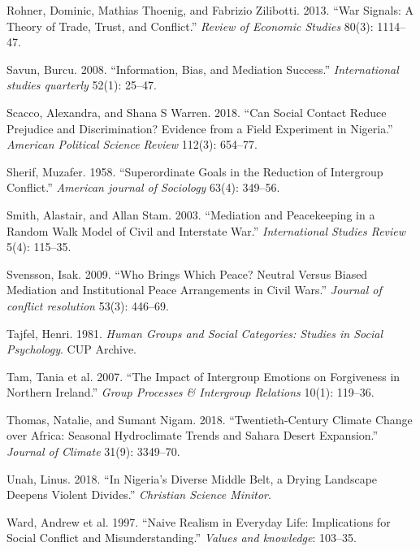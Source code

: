 \documentclass[11pt]{article}
\begin{document}
\leavevmode\hypertarget{ref-rohner2013war}{}%
Rohner, Dominic, Mathias Thoenig, and Fabrizio Zilibotti. 2013. ``War
Signals: A Theory of Trade, Trust, and Conflict.'' \emph{Review of
Economic Studies} 80(3): 1114--47.

\leavevmode\hypertarget{ref-savun2008information}{}%
Savun, Burcu. 2008. ``Information, Bias, and Mediation Success.''
\emph{International studies quarterly} 52(1): 25--47.

\leavevmode\hypertarget{ref-scacco2018nigeria}{}%
Scacco, Alexandra, and Shana S Warren. 2018. ``Can Social Contact Reduce
Prejudice and Discrimination? Evidence from a Field Experiment in
Nigeria.'' \emph{American Political Science Review} 112(3): 654--77.

\leavevmode\hypertarget{ref-sherif1958superordinate}{}%
Sherif, Muzafer. 1958. ``Superordinate Goals in the Reduction of
Intergroup Conflict.'' \emph{American journal of Sociology} 63(4):
349--56.

\leavevmode\hypertarget{ref-smith2003mediation}{}%
Smith, Alastair, and Allan Stam. 2003. ``Mediation and Peacekeeping in a
Random Walk Model of Civil and Interstate War.'' \emph{International
Studies Review} 5(4): 115--35.

\leavevmode\hypertarget{ref-svensson2009brings}{}%
Svensson, Isak. 2009. ``Who Brings Which Peace? Neutral Versus Biased
Mediation and Institutional Peace Arrangements in Civil Wars.''
\emph{Journal of conflict resolution} 53(3): 446--69.

\leavevmode\hypertarget{ref-tajfel1981groups}{}%
Tajfel, Henri. 1981. \emph{Human Groups and Social Categories: Studies
in Social Psychology}. CUP Archive.

\leavevmode\hypertarget{ref-tam2007impact}{}%
Tam, Tania et al. 2007. ``The Impact of Intergroup Emotions on
Forgiveness in Northern Ireland.'' \emph{Group Processes \& Intergroup
Relations} 10(1): 119--36.

\leavevmode\hypertarget{ref-thomas2018sahara}{}%
Thomas, Natalie, and Sumant Nigam. 2018. ``Twentieth-Century Climate
Change over Africa: Seasonal Hydroclimate Trends and Sahara Desert
Expansion.'' \emph{Journal of Climate} 31(9): 3349--70.

\leavevmode\hypertarget{ref-unah2018nigeria}{}%
Unah, Linus. 2018. ``In Nigeria's Diverse Middle Belt, a Drying
Landscape Deepens Violent Divides.'' \emph{Christian Science Minitor}.

\leavevmode\hypertarget{ref-ward1997naive}{}%
Ward, Andrew et al. 1997. ``Naive Realism in Everyday Life: Implications
for Social Conflict and Misunderstanding.'' \emph{Values and knowledge}:
103--35.
\end{document}
